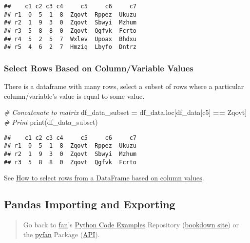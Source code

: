 \documentclass[
]{book}
\newenvironment{Shaded}{\begin{snugshade}}{\end{snugshade}}
\newcommand{\BuiltInTok}[1]{#1}
\newcommand{\CommentTok}[1]{\textcolor[rgb]{0.56,0.35,0.01}{\textit{#1}}}
\newcommand{\NormalTok}[1]{#1}
\newcommand{\OperatorTok}[1]{\textcolor[rgb]{0.81,0.36,0.00}{\textbf{#1}}}
\newcommand{\StringTok}[1]{\textcolor[rgb]{0.31,0.60,0.02}{#1}}
\begin{document}
\begin{verbatim}
##    c1 c2 c3 c4     c5     c6     c7
## r1  0  5  1  8  Zqovt  Rppez  Ukuzu
## r2  1  9  3  0  Zqovt  Sbwyi  Mzhum
## r3  5  8  8  0  Zqovt  Qgfvk  Fcrto
## r4  5  2  5  7  Wxlev  Upoax  Bhdxu
## r5  4  6  2  7  Hmziq  Lbyfo  Dntrz
\end{verbatim}

\hypertarget{select-rows-based-on-columnvariable-values}{%
\subsubsection{Select Rows Based on Column/Variable Values}\label{select-rows-based-on-columnvariable-values}}

There is a dataframe with many rows, select a subset of rows where a particular column/variable's value is equal to some value.

\begin{Shaded}
\begin{Highlighting}[]
\CommentTok{\# Concatenate to matrix}
\NormalTok{df\_data\_subset }\OperatorTok{=}\NormalTok{ df\_data.loc[df\_data[}\StringTok{\textquotesingle{}c5\textquotesingle{}}\NormalTok{] }\OperatorTok{==} \StringTok{\textquotesingle{}Zqovt\textquotesingle{}}\NormalTok{]}
\CommentTok{\# Print}
\BuiltInTok{print}\NormalTok{(df\_data\_subset)}
\end{Highlighting}
\end{Shaded}

\begin{verbatim}
##    c1 c2 c3 c4     c5     c6     c7
## r1  0  5  1  8  Zqovt  Rppez  Ukuzu
## r2  1  9  3  0  Zqovt  Sbwyi  Mzhum
## r3  5  8  8  0  Zqovt  Qgfvk  Fcrto
\end{verbatim}

See \href{https://stackoverflow.com/a/17071908/8280804}{How to select rows from a DataFrame based on column values}.

\hypertarget{pandas-importing-and-exporting}{%
\subsection{Pandas Importing and Exporting}\label{pandas-importing-and-exporting}}

\begin{quote}
Go back to \href{http://fanwangecon.github.io/}{fan}'s \href{https://fanwangecon.github.io/Py4Econ/}{Python Code Examples} Repository (\href{https://fanwangecon.github.io/Py4Econ/bookdown}{bookdown site}) or the \href{https://pyfan.readthedocs.io/en/latest/}{pyfan} Package (\href{https://pyfan.readthedocs.io/en/latest/reference.html}{API}).
\end{quote}
\end{document}
